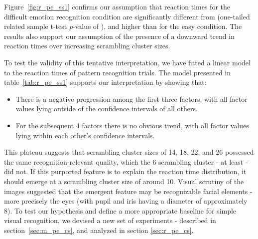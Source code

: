 	    Figure~\ref{fig:r_pe_ss1} confirms our assumption that reaction times for the difficult emotion recognition condition are significantly different from (one-tailed related sample t-test \textit{p}-value of 
	    ),
	    and higher than for the easy condition.
	    The results also support our assumption of the presence of a downward trend in reaction times over increasing scrambling cluster sizes.
	    
	    To test the validity of this tentative interpretation, we have fitted a linear model to the reaction times of pattern recognition trials.
	    The model presented in table~\ref{tab:r_pe_ss1} supports our interpretation by showing that:
	    \begin{itemize}
		\item There is a negative progression among the first three factors, with all factor values lying outside of the confidence intervals of all others.
		\item For the subsequent 4 factors there is no obvious trend, with all factor values lying within each other's confidence intervals. 
	    \end{itemize}

	    This plateau suggests that scrambling cluster sizes of \SI{14}{\pixel}, \SI{18}{\pixel}, \SI{22}{\pixel}, and \SI{26}{\pixel} possessed the same recognition-relevant quality, which the \SI{6}{\pixel} scrambling cluster - at least - did not.
	    If this purported feature is to explain the reaction time distribution, it should emerge at a scrambling cluster size of around \SI{10}{\pixel}.
	    Visual scrutiny of the images suggested that the emergent feature may be recognizable facial elements - more precisely the eyes (with pupil and iris having a diameter of approximately \SI{8}{\pixel}).
	    To test our hypothesis and define a more appropriate baseline for simple visual recognition, we devised a new set of experiments - described in section~\ref{sec:m_pe_cs}, and analyzed in section \ref{sec:r_pe_cs}.
	    
